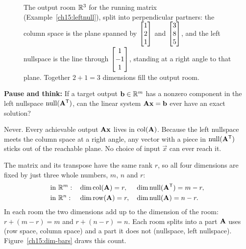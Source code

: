 \begin{figure}[htbp]
\centering
{}
\caption{The output room $\mathbb{R}^3$ for the running matrix
(Example~\ref{ch15:leftnull}), split into perpendicular partners: the column space is the plane
spanned by $\protect\begin{bmatrix}1\\2\\1\end{bmatrix}$ and $\protect\begin{bmatrix}3\\8\\5\end{bmatrix}$, and the left nullspace is the line
through $\protect\begin{bmatrix}1\\-1\\1\end{bmatrix}$, standing at a right angle to that plane. Together $2+1=3$
dimensions fill the output room.}
\label{ch15:colspace-leftnull}
\end{figure}

\begin{recoverybox}
\textbf{Pause and think:} If a target output $\mathbf{b} \in \mathbb{R}^m$ has a nonzero component in the left
nullspace $\operatorname{null}(\mathbf{A}^{\mathsf{T}})$, can the linear system $\mathbf{A}\mathbf{x} = \mathbf{b}$ ever have an exact
solution?
\vspace{0.3em}

Never. Every achievable output $\mathbf{A}\mathbf{x}$ lives in $\operatorname{col}(\mathbf{A})$. Because the left nullspace
meets the column space at a right angle, any vector with a piece in $\operatorname{null}(\mathbf{A}^{\mathsf{T}})$ sticks out
of the reachable plane. No choice of input $\vec{x}$ can ever reach it.
\end{recoverybox}

\begin{aestheticbox}
The matrix and its transpose have the same rank $r$, so all four dimensions are fixed by just
three whole numbers, $m$, $n$ and $r$:
\[
  \begin{aligned}
    &\text{in }\mathbb{R}^m: && \operatorname{dim}\operatorname{col}(\mathbf{A})=r, && \operatorname{dim}\operatorname{null}(\mathbf{A}^{\mathsf{T}})=m-r,\\
    &\text{in }\mathbb{R}^n: && \operatorname{dim}\operatorname{row}(\mathbf{A})=r, && \operatorname{dim}\operatorname{null}(\mathbf{A})=n-r.
  \end{aligned}
\]
In each room the two dimensions add up to the dimension of the room: $r+(m-r)=m$ and
$r+(n-r)=n$. Each room splits into a part $\mathbf{A}$ uses (row space, column space) and a part it
does not (nullspace, left nullspace). Figure~\ref{ch15:dim-bars} draws this count.
\end{aestheticbox}

